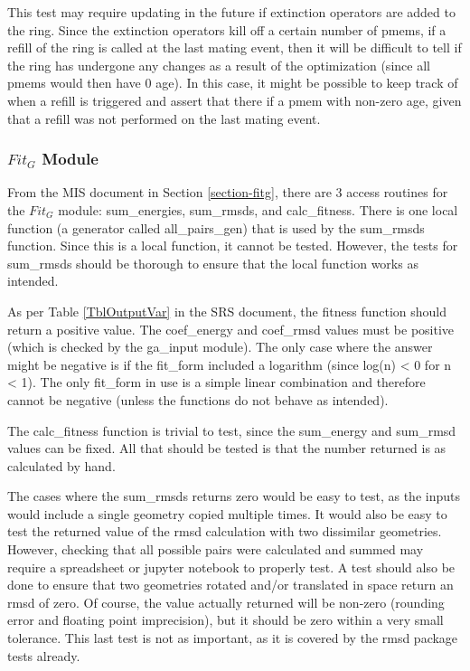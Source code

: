 \documentclass[12pt, titlepage]{article}
\begin{document}
\begin{enumerate}
This test may require updating in the future if extinction operators are added 
to the ring. Since the extinction operators kill off a certain number of pmems, 
if a refill of the ring is called at the last mating event, then it will be 
difficult to tell if the ring has undergone any changes as a result of the 
optimization (since all pmems would then have 0 age). In this case, it might be 
possible to keep track of when a refill is triggered and assert that there if a 
pmem with non-zero age, given that a refill was not performed on the last 
mating event.
	
\end{enumerate}

\subsubsection{$Fit_G$ Module}

From the MIS document in Section \ref{section-fitg}, there are 3 access 
routines for the $Fit_G$ module: sum\_energies, sum\_rmsds, and calc\_fitness. 
There is one local function (a generator called all\_pairs\_gen) that is used 
by the sum\_rmsds function. Since this is a local function, it cannot be 
tested. However, the tests for sum\_rmsds should be thorough to ensure that the 
local function works as intended.

As per Table \ref{TblOutputVar} in the SRS document, the fitness function 
should return a positive value. The coef\_energy and coef\_rmsd values must be 
positive (which is checked by the ga\_input module). The only case where the 
answer might be negative is if the fit\_form included a logarithm (since log(n) 
< 0 for n < 1). The only fit\_form in use is a simple linear combination and 
therefore cannot be negative (unless the functions do not behave as intended).

The calc\_fitness function is trivial to test, since the sum\_energy and 
sum\_rmsd values can be fixed. All that should be tested is that the number 
returned is as calculated by hand. 

The cases where the sum\_rmsds returns zero would be easy to test, as the 
inputs would include a single geometry copied multiple times. It would also be 
easy to test the returned value of the rmsd calculation with two dissimilar 
geometries. However, checking that all possible pairs were calculated and 
summed may require a spreadsheet or jupyter notebook to properly test. A test 
should also be done to ensure that two geometries rotated and/or translated in 
space return an rmsd of zero. Of course, the value actually returned will be 
non-zero (rounding error and floating point imprecision), but it should be zero 
within a very small tolerance. This last test is not as important, as it is 
covered by the rmsd package tests already.
\end{document}

